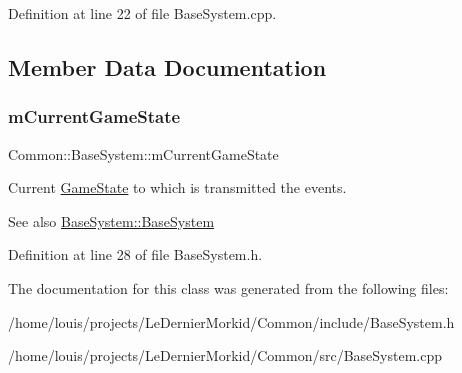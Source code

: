 Definition at line 22 of file Base\+System.\+cpp.



\subsection{Member Data Documentation}
\mbox{\label{class_common_1_1_base_system_a18e8e37eb4089bbde95459e16291b87a}} 
\subsubsection{\texorpdfstring{m\+Current\+Game\+State}{mCurrentGameState}}
{\footnotesize\ttfamily Common\+::\+Base\+System\+::m\+Current\+Game\+State\hspace{0.3cm}{\ttfamily [protected]}}



Current \hyperlink{class_common_1_1_game_state}{Game\+State} to which is transmitted the events. 

\begin{DoxySeeAlso}{See also}
\hyperlink{class_common_1_1_base_system_a420a9f2bb9ccec58af8de74cfc71a9fd}{Base\+System\+::\+Base\+System} 
\end{DoxySeeAlso}


Definition at line 28 of file Base\+System.\+h.



The documentation for this class was generated from the following files\+:\begin{DoxyCompactItemize}
\item 
/home/louis/projects/\+Le\+Dernier\+Morkid/\+Common/include/Base\+System.\+h\item 
/home/louis/projects/\+Le\+Dernier\+Morkid/\+Common/src/Base\+System.\+cpp\end{DoxyCompactItemize}
